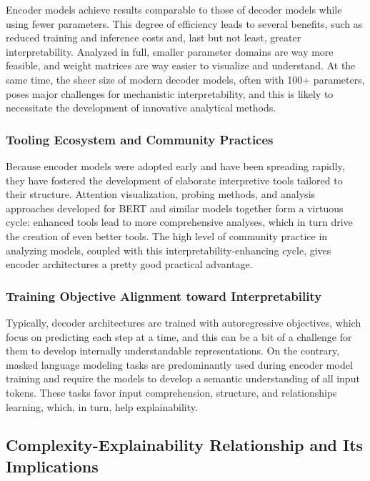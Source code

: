 \documentclass[preprint,12pt]{elsarticle}
\begin{document}
Encoder models achieve results comparable to those of decoder models while using fewer parameters. This degree of efficiency leads to several benefits, such as reduced training and inference costs and, last but not least, greater interpretability. Analyzed in full, smaller parameter domains are way more feasible, and weight matrices are way easier to visualize and understand. At the same time, the sheer size of modern decoder models, often with 100+ parameters, poses major challenges for mechanistic interpretability, and this is likely to necessitate the development of innovative analytical methods.

\subsubsection{Tooling Ecosystem and Community Practices}

Because encoder models were adopted early and have been spreading rapidly, they have fostered the development of elaborate interpretive tools tailored to their structure. Attention visualization, probing methods, and analysis approaches developed for BERT and similar models together form a virtuous cycle: enhanced tools lead to more comprehensive analyses, which in turn drive the creation of even better tools. The high level of community practice in analyzing models, coupled with this interpretability-enhancing cycle, gives encoder architectures a pretty good practical advantage.

\subsubsection{Training Objective Alignment toward Interpretability}

Typically, decoder architectures are trained with autoregressive objectives, which focus on predicting each step at a time, and this can be a bit of a challenge for them to develop internally understandable representations. On the contrary, masked language modeling tasks are predominantly used during encoder model training and require the models to develop a semantic understanding of all input tokens. These tasks favor input comprehension, structure, and relationships learning, which, in turn, help explainability.

\subsection{Complexity-Explainability Relationship and Its Implications}
\end{document}
